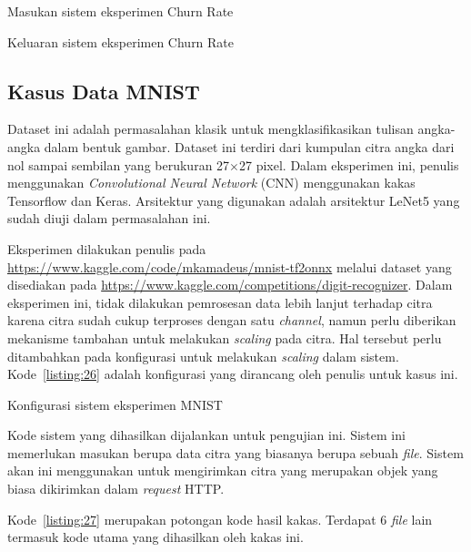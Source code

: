 \begin{code}
	\caption{Masukan sistem eksperimen Churn Rate}\label{listing:24}
\end{code}

\begin{code}
	\caption{Keluaran sistem eksperimen Churn Rate}\label{listing:25}
\end{code}

\subsection{Kasus Data MNIST}

Dataset ini adalah permasalahan klasik untuk mengklasifikasikan tulisan angka-angka dalam bentuk gambar.
Dataset ini terdiri dari kumpulan citra angka dari nol sampai sembilan yang berukuran 27\(\times\)27 pixel.
Dalam eksperimen ini, penulis menggunakan \textit{Convolutional Neural Network} (CNN) menggunakan kakas Tensorflow dan Keras.
Arsitektur yang digunakan adalah arsitektur LeNet5 yang sudah diuji dalam permasalahan ini.

Eksperimen dilakukan penulis pada \url{https://www.kaggle.com/code/mkamadeus/mnist-tf2onnx} melalui dataset yang disediakan pada \url{https://www.kaggle.com/competitions/digit-recognizer}.
Dalam eksperimen ini, tidak dilakukan pemrosesan data lebih lanjut terhadap citra karena citra sudah cukup terproses dengan satu \textit{channel}, namun perlu diberikan mekanisme tambahan untuk melakukan \textit{scaling} pada citra.
Hal tersebut perlu ditambahkan pada konfigurasi untuk melakukan \textit{scaling} dalam sistem.
Kode~\ref{listing:26} adalah konfigurasi yang dirancang oleh penulis untuk kasus ini.


\begin{code}
	\caption{Konfigurasi sistem eksperimen MNIST}\label{listing:26}
\end{code}

Kode sistem yang dihasilkan dijalankan untuk pengujian ini.
Sistem ini memerlukan masukan berupa data citra yang biasanya berupa sebuah \textit{file}.
Sistem akan ini menggunakan  untuk mengirimkan citra yang merupakan objek yang biasa dikirimkan dalam \textit{request} HTTP.\@

Kode~\ref{listing:27} merupakan potongan kode hasil kakas.
Terdapat 6 \textit{file} lain termasuk kode utama yang dihasilkan oleh kakas ini.

